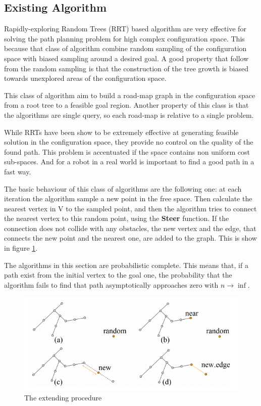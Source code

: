 \documentclass[10pt]{article}
\begin{document}
	\subsection{Existing Algorithm}

	Rapidly-exploring Random Trees (RRT) based algorithm are very effective for solving the path planning problem for high complex configuration space. This because that class of algorithm combine random sampling of the configuration space with biased sampling around a desired goal. A good property that follow from the random sampling is that the construction of the tree growth is biased towards unexplored areas of the configuration space.
	
	This class of algorithm aim to build a road-map graph in the configuration space from a root tree to a feasible goal region. Another property of this class is that the algorithms are single query, so each road-map is relative to a single problem. 
	
	While RRTs have been show to be extremely effective at generating feasible solution in the configuration space, they provide no control on the quality of the found path. This problem is accentuated if the space contains non uniform cost sub-spaces. And for a robot in a real world is important to find a good path in a fast way.
	
	The basic behaviour of this class of algorithms are the following one: at each iteration the algorithm  sample a new point in the free space. Then calculate the nearest vertex in V to the sampled point, and then the algorithm tries to connect the nearest vertex to this random point, using the \textbf{Steer} function. If the connection does not collide with any obstacles, the new vertex and the edge, that connects the new point and the nearest one, are added to the graph. This is show in figure \ref{fig:extension}.
	
		
	The algorithms in this section are probabilistic complete. This means that, if a path exist from the initial vertex to the goal one, the probability that the algorithm fails to find that path asymptotically approaches zero with $n \rightarrow \inf$. 
	
	
	\FloatBarrier
	\begin{figure}[bht]
		\centering
		\includegraphics[width=0.8\linewidth]{rrtExt.png}
		\caption{The extending procedure}
		\label{fig:extension}
	\end{figure}
\FloatBarrier
\end{document}

